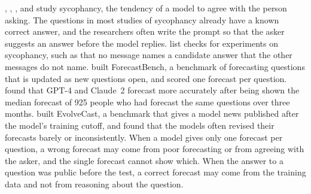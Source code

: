 \documentclass[11pt]{article}
\begin{document}
\citet{sharma2023}, \citet{laban2023}, \citet{fanous2025syceval}, \citet{hong2025} and \citet{kumaran2025} study sycophancy, the tendency of a model to agree with the person asking. The questions in most studies of sycophancy already have a known correct answer, and the researchers often write the prompt so that the asker suggests an answer before the model replies. \citet{gupta2026} list checks for experiments on sycophancy, such as that no message names a candidate answer that the other messages do not name. \citet{karger2025forecastbench} built ForecastBench, a benchmark of forecasting questions that is updated as new questions open, and scored one forecast per question. \citet{schoenegger2024} found that GPT-4 and Claude~2 forecast more accurately after being shown the median forecast of 925 people who had forecast the same questions over three months. \citet{yuan2025} built EvolveCast, a benchmark that gives a model news published after the model's training cutoff, and found that the models often revised their forecasts barely or inconsistently. When a model gives only one forecast per question, a wrong forecast may come from poor forecasting or from agreeing with the asker, and the single forecast cannot show which. When the answer to a question was public before the test, a correct forecast may come from the training data and not from reasoning about the question.
\end{document}
